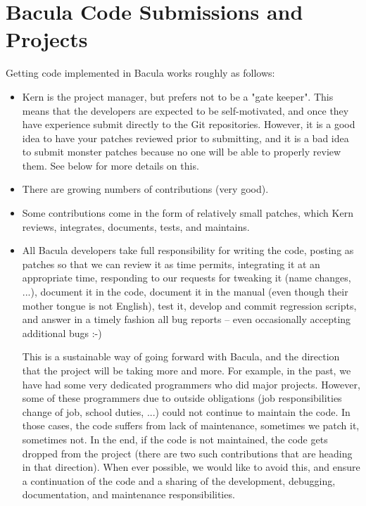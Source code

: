 \section{Bacula Code Submissions and Projects}

Getting code implemented in Bacula works roughly as follows:

\begin{itemize}

\item Kern is the project manager, but prefers not to be a "gate keeper".
      This means that the developers are expected to be self-motivated,
      and once they have experience submit directly to the Git
      repositories. However,
      it is a good idea to have your patches reviewed prior to submitting,
      and it is a bad idea to submit monster patches because no one will
      be able to properly review them. See below for more details on this.

\item  There are growing numbers of contributions (very good).

\item Some contributions come in the form of relatively small patches,
     which Kern reviews, integrates, documents, tests, and maintains.

\item All Bacula developers take full
   responsibility for writing the code, posting as patches so that we can
   review it as time permits, integrating it at an appropriate time,
   responding to our requests for tweaking it (name changes, ...),
   document it in the code, document it in the manual (even though
   their mother tongue is not English), test it, develop and commit
   regression scripts, and answer in a timely fashion all bug reports --
   even occasionally accepting additional bugs :-)

   This is a sustainable way of going forward with Bacula, and the
   direction that the project will be taking more and more.  For
   example, in the past, we have had some very dedicated programmers
   who did major projects. However, some of these
   programmers due to outside obligations (job responsibilities change of
   job, school duties, ...) could not continue to maintain the code.  In
   those cases, the code suffers from lack of maintenance, sometimes we
   patch it, sometimes not.  In the end, if the code is not maintained, the
   code gets dropped from the project (there are two such contributions
   that are heading in that direction).  When ever possible, we would like
   to avoid this, and ensure a continuation of the code and a sharing of
   the development, debugging, documentation, and maintenance
   responsibilities.
\end{itemize}

